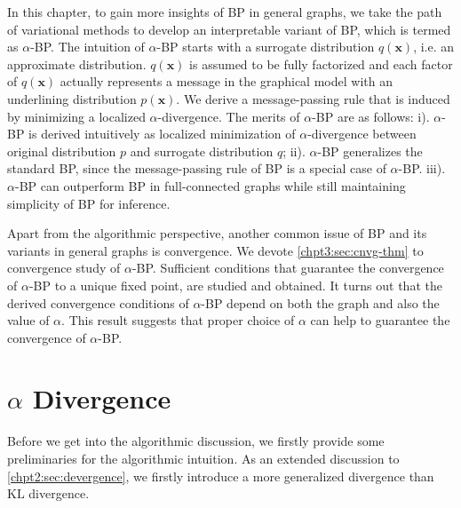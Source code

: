 In this chapter, to gain more insights of BP in general graphs, we take the path of variational methods to develop an interpretable variant of BP, which is termed as $\alpha$-BP.
The intuition of $\alpha$-BP starts with a surrogate distribution $q(\bm{x})$, i.e. an approximate distribution. $q(\bm{x})$ is assumed to be fully factorized and each factor of $q(\bm{x})$ actually represents a message in the graphical model with an underlining distribution $p(\bm{x})$. We derive a message-passing rule that is induced by minimizing a localized $\alpha$-divergence. The merits of $\alpha$-BP are as follows: i). {$\alpha$-BP is derived intuitively as localized minimization of $\alpha$-divergence between original distribution $p$ and surrogate distribution $q$}; ii). {$\alpha$-BP generalizes the standard BP, since the message-passing rule of BP is a special case of $\alpha$-BP}. iii). {$\alpha$}-BP can outperform BP in full-connected graphs while still maintaining simplicity of BP for inference.

Apart from the algorithmic perspective, another common issue of BP and its variants in general graphs is convergence. We devote \autoref{chpt3:sec:cnvg-thm} to convergence study of $\alpha$-BP. Sufficient conditions that guarantee the convergence of $\alpha$-BP to a unique fixed point, are studied and obtained. It turns out that the derived convergence conditions of $\alpha$-BP depend on both the graph and also the value of $\alpha$. This result suggests that proper choice of $\alpha$ can help to guarantee the convergence of $\alpha$-BP.

\section{$\alpha$ Divergence}
\label{chpt3:sec:alpha-divergence}
Before we get into the algorithmic discussion, we firstly provide some preliminaries for the algorithmic intuition. As an extended discussion to \autoref{chpt2:sec:devergence}, we firstly introduce a more generalized divergence than $\mathrm{KL}$ divergence.

